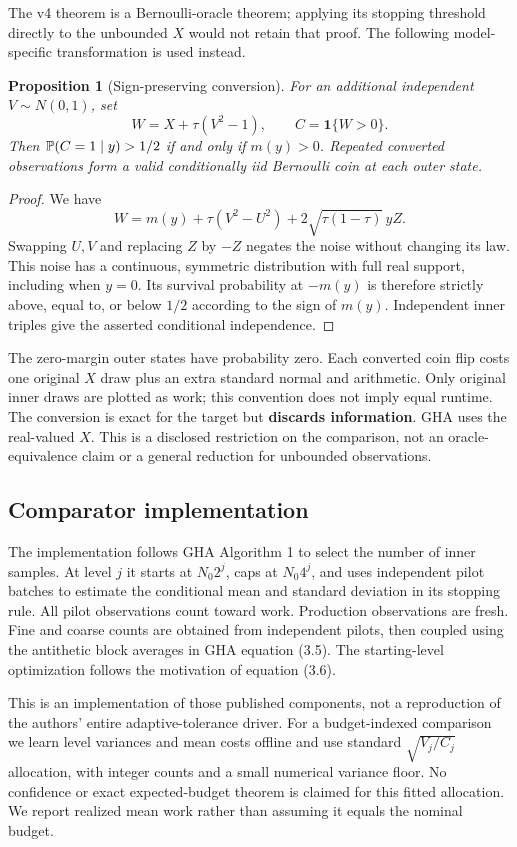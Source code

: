 \documentclass[11pt]{article}
\newtheorem{proposition}[theorem]{Proposition}
\theoremstyle{definition}\newtheorem{conjecture}[theorem]{Conjecture}
\theoremstyle{remark}\newtheorem{remark}[theorem]{Remark}
\newcommand{\ind}{\mathbf1}\newcommand{\kl}{\operatorname{kl}}\newcommand{\KL}{\operatorname{KL}}
\begin{document}
The v4 theorem is a Bernoulli-oracle theorem; applying its stopping threshold directly to the unbounded $X$ would not retain that proof. The following model-specific transformation is used instead.
\begin{proposition}[Sign-preserving conversion]\label{prop:convert}
For an additional independent $V\sim N(0,1)$, set
\[
 W=X+\tau(V^2-1),\qquad C=\ind\{W>0\}.
\]
Then $\mathbb P(C=1\mid y)>1/2$ if and only if $m(y)>0$. Repeated converted observations form a valid conditionally iid Bernoulli coin at each outer state.
\end{proposition}
\begin{proof}
We have
\[
 W=m(y)+\tau(V^2-U^2)+2\sqrt{\tau(1-\tau)}\,yZ.
\]
Swapping $U,V$ and replacing $Z$ by $-Z$ negates the noise without changing its law. This noise has a continuous, symmetric distribution with full real support, including when $y=0$. Its survival probability at $-m(y)$ is therefore strictly above, equal to, or below $1/2$ according to the sign of $m(y)$. Independent inner triples give the asserted conditional independence.
\end{proof}
The zero-margin outer states have probability zero. Each converted coin flip costs one original $X$ draw plus an extra standard normal and arithmetic. Only original inner draws are plotted as work; this convention does not imply equal runtime. The conversion is exact for the target but \textbf{discards information}. GHA uses the real-valued $X$. This is a disclosed restriction on the comparison, not an oracle-equivalence claim or a general reduction for unbounded observations.

\subsection{Comparator implementation}
The implementation follows GHA Algorithm 1 to select the number of inner samples. At level $j$ it starts at $N_0 2^j$, caps at $N_0 4^j$, and uses independent pilot batches to estimate the conditional mean and standard deviation in its stopping rule. All pilot observations count toward work. Production observations are fresh. Fine and coarse counts are obtained from independent pilots, then coupled using the antithetic block averages in GHA equation (3.5). The starting-level optimization follows the motivation of equation (3.6).

This is an implementation of those published components, not a reproduction of the authors' entire adaptive-tolerance driver. For a budget-indexed comparison we learn level variances and mean costs offline and use standard $\sqrt{V_j/C_j}$ allocation, with integer counts and a small numerical variance floor. No confidence or exact expected-budget theorem is claimed for this fitted allocation. We report realized mean work rather than assuming it equals the nominal budget.
\end{document}

